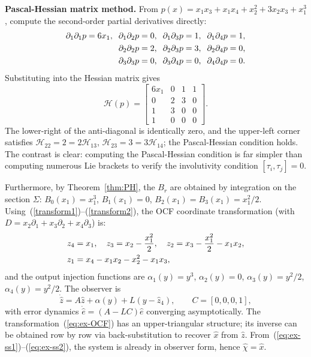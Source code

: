 \documentclass[11pt]{article}
\begin{document}
\textbf{Pascal-Hessian matrix method.}
From $p(x)=x_1x_3+x_1x_4+x_2^2+3x_2x_3+x_1^3$, compute the second-order partial derivatives directly:
\begin{align}
	\partial_1\partial_1p=6x_1,\;\;
	\partial_1\partial_2p=0,\;\;
	\partial_1\partial_3p=1,\;\;
	\partial_1\partial_4p=1,\notag\\
	\partial_2\partial_2p=2,\;\;
	\partial_2\partial_3p=3,\;\;
	\partial_2\partial_4p=0,\notag\\
	\partial_3\partial_3p=0,\;\;
	\partial_3\partial_4p=0,\;\;
	\partial_4\partial_4p=0.\notag
\end{align}
Substituting into the Hessian matrix gives
\begin{equation}\label{eq:ex-H}
	\mathcal{H}(p)=\begin{bmatrix}
		6x_1 & 0 & 1 & 1\\
		0    & 2 & 3 & 0\\
		1    & 3 & 0 & 0\\
		1    & 0 & 0 & 0
	\end{bmatrix}.
\end{equation}
The lower-right of the anti-diagonal is identically zero, and the upper-left corner satisfies $\mathcal{H}_{22}=2=2\mathcal{H}_{13}$, $\mathcal{H}_{23}=3=3\mathcal{H}_{14}$; the Pascal-Hessian condition holds. The contrast is clear: computing the Pascal-Hessian condition is far simpler than computing numerous Lie brackets to verify the involutivity condition $[\tau_i,\tau_j]=0$.

Furthermore, by Theorem~\ref{thm:PH}, the $B_r$ are obtained by integration on the section $\Sigma$:
$B_0(x_1)=x_1^3$, $B_1(x_1)=0$, $B_2(x_1)=B_3(x_1)=x_1^2/2$.
Using~(\ref{transform1})--(\ref{transform2}), the OCF coordinate transformation (with $D=x_2\partial_1+x_3\partial_2+x_4\partial_3$) is:
\begin{align}
	z_4&=x_1,\quad
	z_3=x_2-\frac{x_1^2}{2},\quad
	z_2=x_3-\frac{x_1^2}{2}-x_1x_2,\notag\\
	z_1&=x_4-x_1x_2-x_2^2-x_1x_3,\label{eq:ex-OCF}
\end{align}
and the output injection functions are $\alpha_1(y)=y^3$, $\alpha_2(y)=0$, $\alpha_3(y)=y^2/2$, $\alpha_4(y)=y^2/2$. The observer is
\begin{equation}\label{eq:ex-observer}
	\dot{\hat{z}}=A\hat{z}+\alpha(y)+L(y-\hat{z}_4),\qquad C=[0,0,0,1],
\end{equation}
with error dynamics $\dot{\hat{e}}=(A-LC)\hat{e}$ converging asymptotically. The transformation~(\ref{eq:ex-OCF}) has an upper-triangular structure; its inverse can be obtained row by row via back-substitution to recover $\hat{x}$ from $\hat{z}$. From~(\ref{eq:ex-ss1})--(\ref{eq:ex-ss2}), the system is already in observer form, hence $\hat{\chi}=\hat{x}$.
\end{document}
